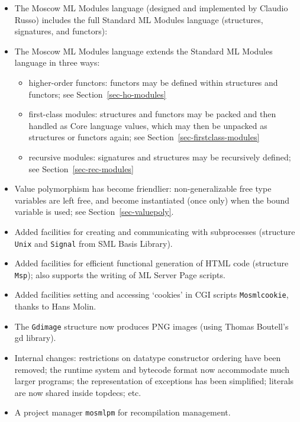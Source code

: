 \documentclass[fleqn,a4paper]{article}
\begin{document}
\begin{itemize}
\item The Moscow ML Modules language (designed and implemented by
  Claudio Russo) includes the full Standard ML Modules language
  (structures, signatures, and functors):
\item The Moscow ML Modules language extends the Standard ML Modules
  language in three ways:
  \begin{itemize}
  \item higher-order functors: functors may be defined within
    structures and functors; see Section~\ref{sec-ho-modules}
  \item first-class modules: structures and functors may be packed and
    then handled as Core language values, which may then be unpacked
    as structures or functors again; see
    Section~\ref{sec-firstclass-modules}
  \item recursive modules: signatures and structures may be
    recursively defined; see Section~\ref{sec-rec-modules}
  \end{itemize}
\item Value polymorphism has become friendlier: non-generalizable free
  type variables are left free, and become instantiated (once only)
  when the bound variable is used; see Section~\ref{sec-valuepoly}.
\item Added facilities for creating and communicating with
  subprocesses (structure \texttt{Unix} and \texttt{Signal} from SML
  Basis Library).
\item Added facilities for efficient functional generation of HTML
  code (structure \texttt{Msp}); also supports the writing of ML
  Server Page scripts.
\item Added facilities setting and accessing `cookies' in CGI scripts
  \texttt{Mosmlcookie}, thanks to Hans Molin.
\item The \texttt{Gdimage} structure now produces PNG images (using
  Thomas Boutell's gd library).
\item Internal changes: restrictions on datatype constructor ordering
  have been removed; the runtime system and bytecode format now
  accommodate much larger programs; the representation of exceptions
  has been simplified; literals are now shared inside topdecs; etc.
\item A project manager \texttt{mosmlpm} for recompilation management.
\end{itemize}

\end{document}
